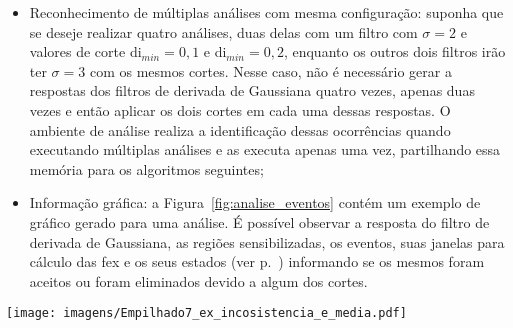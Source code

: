 \begin{itemize}
\item Reconhecimento de múltiplas análises com mesma configuração:
suponha que se deseje realizar quatro análises, duas delas com um filtro com
$\sigma=2$ e valores de corte \acs{di}$_{min}=0,1$ e
\acs{di}$_{min}=0,2$, enquanto os outros dois filtros irão ter 
$\sigma=3$ com os mesmos cortes. Nesse caso, não é necessário gerar a
respostas dos filtros de derivada de Gaussiana quatro vezes, apenas
duas vezes e então aplicar os dois cortes em cada uma dessas
respostas. O ambiente de análise realiza a identificação dessas
ocorrências quando executando múltiplas análises e as executa apenas
uma vez, partilhando essa memória para os algoritmos seguintes; 

\item Informação gráfica: a Figura~\ref{fig:analise_eventos} contém um
exemplo de gráfico gerado para uma análise. É possível observar a
resposta do filtro de derivada de Gaussiana, as regiões
sensibilizadas, os eventos, suas janelas para cálculo das \acs{fex} e
os seus estados (ver p.~\pageref{text:estados_eventos}) informando se
os mesmos foram aceitos ou foram eliminados devido a algum dos cortes.

\end{itemize}


\begin{sidewaysfigure}[p]
\centering
\texttt{[image: imagens/Empilhado7\_ex\_incosistencia\_e\_media.pdf]}
\caption[Exemplo de informação gráfica para o Módulo de Análise dos
Dados.]{Exemplo de informação gráfica para o Módulo de Análise dos
Dados. Na subfigura inferior, as regiões verdes e vermelhas indicam
regiões sensibilizadas por respostas positivas e negativas,
respectivamente. A resposta para o filtro de
derivada de Gaussiana é representado pela linha pontilhada, enquanto a
linha horizontal cinza é o limear de corte para a geração de uma região
sensibilizada. É possível observar um caso de evento incosistente e
outro removido devido a evento próximo. Para o caso do evento inconsistente, em azul, seu
degrau de potência é positivo enquanto sua resposta é negativa,
revelando sua incosistência. Já os eventos próximos representados
pelas caixas amarelas foram removidos por estarem próximos, sendo
substituídos pela sua média (a linha verde). Nessa figura também é possível observar
as regiões que serão utilizadas para a extração do transitório (região
cinza) e as regiões utilizadas para calcular o degrau de potência
(regiões amarelas pré/pós-transitório). }
\label{fig:analise_eventos}
\end{sidewaysfigure}


